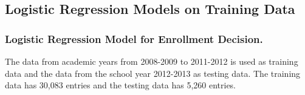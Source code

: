 \documentclass[12pt,english]{report}
\begin{document}

\subsection{Logistic Regression Models on Training Data }

\subsubsection{Logistic Regression Model for Enrollment Decision.} 

The data from academic years from 2008-2009 to 2011-2012 is used as training data and the data from the school year 2012-2013 as testing data. The training data has 30,083 entries and the testing data has 5,260 entries. 
\end{document}
